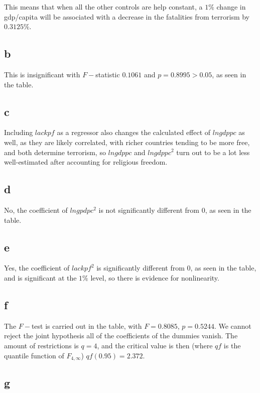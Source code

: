 \documentclass[12pt,letterpaper]{article}
\theoremstyle{definition}
\begin{document}
This means that when all the other controls are help constant, a $1\%$ change in gdp/capita will be associated with a decrease in the fatalities from terrorism by $0.3125\%$.

\subsection*{b}

This is insignificant with $F-$statistic $0.1061$ and $p = 0.8995 > 0.05$, as seen in the table.

\subsection*{c}

Including $lackpf$ as a regressor also changes the calculated effect of $lngdppc$ as well, as they are likely correlated, with richer countries tending to be more free, and both determine terrorism, so $lngdppc$ and $lngdppc^{2}$ turn out to be a lot less well-estimated after accounting for religious freedom.

\subsection*{d}

No, the coefficient of $lngpdpc^{2}$ is not significantly different from 0, as seen in the table.

\subsection*{e}

Yes, the coefficient of $lackpf^{2}$ is significantly different from 0, as seen in the table, and is significant at the $1\%$ level, so there is evidence for nonlinearity.

\subsection*{f}

The $F-$test is carried out in the table, with $F = 0.8085$, $p = 0.5244$. We cannot reject the joint hypothesis all of the coefficients of the dummies vanish. The amount of restrictions is $q = 4$, and the critical value is then (where $qf$ is the quantile function of $F_{4,\infty}$) $qf(0.95) = 2.372$.

\subsection*{g}
\end{document}
